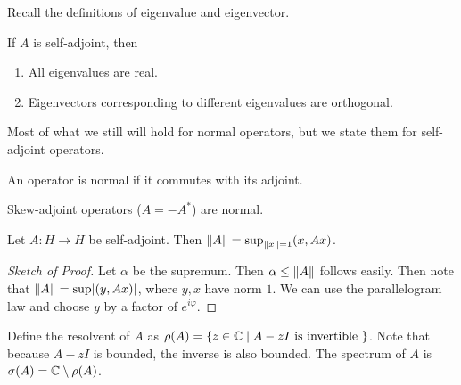 \documentclass[10pt, twoside]{article}
\begin{document}
    Recall the definitions of eigenvalue and eigenvector.
    \begin{prop}
        If $A$ is self-adjoint, then 
        \begin{enumerate}
            \item All eigenvalues are real.
            \item Eigenvectors corresponding to different eigenvalues are orthogonal.
        \end{enumerate}
    \end{prop}

    Most of what we still will hold for normal operators, but we state them for self-adjoint operators.

    \begin{defn}
        An operator is normal if it commutes with its adjoint.
    \end{defn}

    \begin{exm}
        Skew-adjoint operators ($A = -A^*$) are normal.
    \end{exm}

    \begin{lem}
        Let $A:H \to H$ be self-adjoint. Then $\lVert A\rVert = \sup_{\lVert x\rVert = 1} (x,Ax)$.
        \begin{proof}[Sketch of Proof]
            Let $\alpha$ be the supremum. Then $\alpha \leq \lVert A\rVert$ follows easily. Then note that $\lVert A\rVert = \sup \lvert(y,Ax)\rvert$, where $y,x$ have norm $1$. We can use the parallelogram law and choose $y$ by a factor of $e^{i\varphi}$.
        \end{proof}
    \end{lem}

    \begin{defn}[Resolvent]
        Define the resolvent of $A$ as $\rho(A) = \{z \in \mathbb{C} \mid A-zI \text{ is invertible } \}$.
    Note that because $A-zI$ is bounded, the inverse is also bounded.
    The spectrum of $A$ is $\sigma(A) = \mathbb{C} \setminus \rho(A)$.
    \end{defn}
\end{document}
